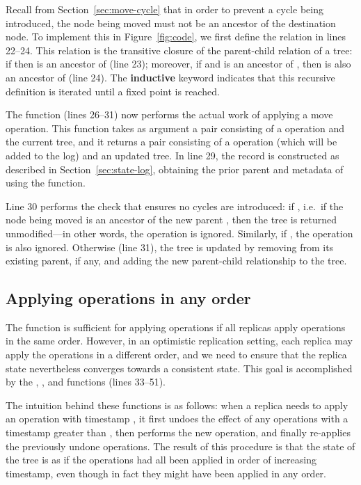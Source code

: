 \documentclass[sigconf]{acmart}
\begin{document}
Recall from Section~\ref{sec:move-cycle} that in order to prevent a cycle being introduced, the node being moved must not be an ancestor of the destination node.
To implement this in Figure~\ref{fig:code}, we first define the  relation in lines 22--24.
This relation is the transitive closure of the parent-child relation of a tree: if  then  is an ancestor of  (line 23); moreover, if  and  is an ancestor of , then  is also an ancestor of  (line 24).
The \textbf{inductive} keyword indicates that this recursive definition is iterated until a fixed point is reached.

The  function (lines 26--31) now performs the actual work of applying a move operation.
This function takes as argument a pair consisting of a  operation and the current tree, and it returns a pair consisting of a  operation (which will be added to the log) and an updated tree.
In line 29, the  record is constructed as described in Section~\ref{sec:state-log}, obtaining the prior parent and metadata of  using the  function.

Line 30 performs the check that ensures no cycles are introduced: if , i.e.\ if the node being moved  is an ancestor of the new parent , then the tree is returned unmodified---in other words, the operation is ignored.
Similarly, if , the operation is also ignored.
Otherwise (line 31), the tree is updated by removing  from its existing parent, if any, and adding the new parent-child relationship  to the tree.

\subsection{Applying operations in any order}\label{sec:applying}

The  function is sufficient for applying operations if all replicas apply operations in the same order.
However, in an optimistic replication setting, each replica may apply the operations in a different order, and we need to ensure that the replica state nevertheless converges towards a consistent state.
This goal is accomplished by the , , and  functions (lines 33--51).

The intuition behind these functions is as follows: when a replica needs to apply an operation with timestamp , it first undoes the effect of any operations with a timestamp greater than , then performs the new operation, and finally re-applies the previously undone operations.
The result of this procedure is that the state of the tree is as if the operations had all been applied in order of increasing timestamp, even though in fact they might have been applied in any order.
\end{document}
